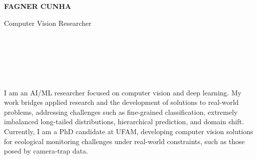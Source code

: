 \documentclass[10pt]{developercv} %
\begin{document}
\begin{minipage}[t]{0.6\textwidth}
  \vspace{-\baselineskip} %

  {\HUGE\textbf{\MakeUppercase{Fagner Cunha}}}
  \vspace{5pt}

  {\Large Computer Vision Researcher} %

  \\

\end{minipage}
\begin{minipage}[t]{0.3\textwidth}
  \vspace{-\baselineskip} %

 \\
\\ \\
\end{minipage}

\vspace{0.5cm}


\begin{minipage}[t]{\textwidth}

I am an AI/ML researcher focused on computer vision and deep learning. My work
bridges applied research and the development of solutions to real-world
problems, addressing challenges such as fine-grained classification, extremely
imbalanced long-tailed distributions, hierarchical prediction, and domain
shift. Currently, I am a PhD candidate at UFAM, developing computer vision
solutions for ecological monitoring challenges under real-world constraints,
such as those posed by camera-trap data. \\

\end{minipage}


\end{document}
